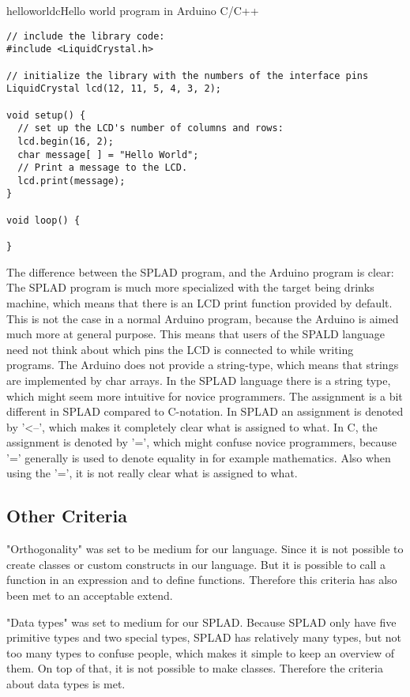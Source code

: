 \begin{code}{helloworldc}{Hello world program in Arduino C/C++}
\begin{lstlisting}
// include the library code:
#include <LiquidCrystal.h>

// initialize the library with the numbers of the interface pins
LiquidCrystal lcd(12, 11, 5, 4, 3, 2);

void setup() {
  // set up the LCD's number of columns and rows: 
  lcd.begin(16, 2);
  char message[ ] = "Hello World";
  // Print a message to the LCD.
  lcd.print(message);
}

void loop() {

}
\end{lstlisting}
\end{code}
The difference between the SPLAD program, and the Arduino program is clear: The SPLAD program is much more specialized with the target being drinks machine, which means that there is an LCD print function provided by default. This is not the case in a normal Arduino program, because the Arduino is aimed much more at general purpose. This means that users of the SPALD language need not think about which pins the LCD is connected to while writing programs. The Arduino does not provide a string-type, which means that strings are implemented by char arrays. In the SPLAD language there is a string type, which might seem more intuitive for novice programmers. The assignment is a bit different in SPLAD compared to C-notation. In SPLAD an assignment is denoted by '<--', which makes it completely clear what is assigned to what. In C, the assignment is denoted by '=', which might confuse novice programmers, because '=' generally is used to denote equality in for example mathematics. Also when using the '=', it is not really clear what is assigned to what.

\subsection{Other Criteria}

"Orthogonality" was set to be medium for our language. Since it is not possible to create classes or custom constructs in our language. But it is possible to call a function in an expression and to define functions. Therefore this criteria has also been met to an acceptable extend.

"Data types" was set to medium for our SPLAD. Because SPLAD only have five primitive types and two special types, SPLAD has relatively many types, but not too many types to confuse people, which makes it simple to keep an overview of them. On top of that, it is not possible to make classes. Therefore the criteria about data types is met.

